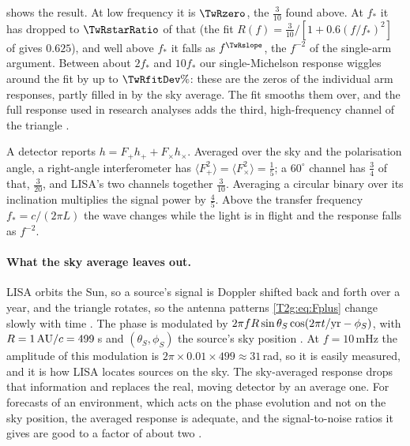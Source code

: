  shows the result. At low frequency it is $\TwRzero$, the $\tfrac3{10}$ found above. At $f_*$ it has dropped to $\TwRstarRatio$ of that (the fit $R(f)=\tfrac3{10}/[1+0.6(f/f_*)^2]$ of \cite[eq.~(9)]{Robson2019} gives $0.625$), and well above $f_*$ it falls as $f^{\TwRslope}$, the $f^{-2}$ of the single-arm argument. Between about $2f_*$ and $10f_*$ our single-Michelson response wiggles around the fit by up to $\TwRfitDev\%$: these are the zeros of the individual arm responses, partly filled in by the sky average. The fit smooths them over, and the full response used in research analyses adds the third, high-frequency channel of the triangle \cite{Robson2019}.

\begin{keyidea}
A detector reports $h=F_+h_++F_\times h_\times$. Averaged over the sky and the polarisation angle, a right-angle interferometer has $\langle F_+^2\rangle=\langle F_\times^2\rangle=\tfrac15$; a $60^\circ$ channel has $\tfrac34$ of that, $\tfrac3{20}$, and LISA's two channels together $\tfrac3{10}$. Averaging a circular binary over its inclination multiplies the signal power by $\tfrac45$. Above the transfer frequency $f_*=c/(2\pi L)$ the wave changes while the light is in flight and the response falls as $f^{-2}$.
\end{keyidea}

\paragraph{What the sky average leaves out.}
LISA orbits the Sun, so a source's signal is Doppler shifted back and forth over a year, and the triangle rotates, so the antenna patterns \eqref{T2g:eq:Fplus} change slowly with time \cite[eqs.~(16)--(17)]{BarackCutler2004}. The phase is modulated by $2\pi fR\sin\theta_S\cos(2\pi t/{\rm yr}-\phi_S)$, with $R=1\,{\rm AU}/c=499$\,s and $(\theta_S,\phi_S)$ the source's sky position \cite[eq.~(33)]{BarackCutler2004}. At $f=10$\,mHz the amplitude of this modulation is $2\pi\times0.01\times499\approx31$\,rad, so it is easily measured, and it is how LISA locates sources on the sky. The sky-averaged response drops that information and replaces the real, moving detector by an average one. For forecasts of an environment, which acts on the phase evolution and not on the sky position, the averaged response is adequate, and the signal-to-noise ratios it gives are good to a factor of about two \cite{Robson2019}.

